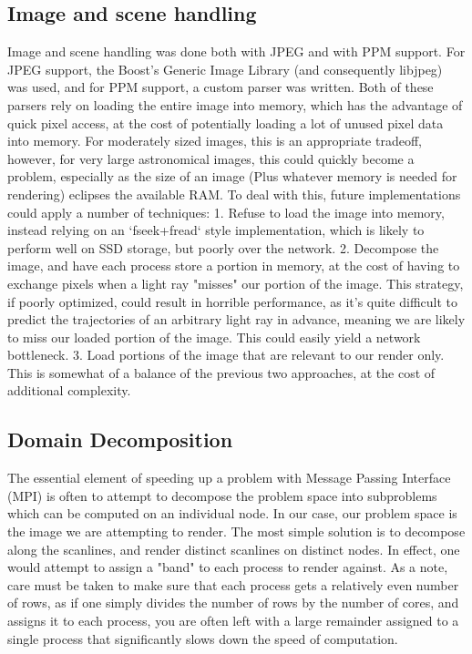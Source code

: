 \subsection{Image and scene handling}
Image and scene handling was done both with JPEG and with PPM support.
For JPEG support, the Boost's Generic Image Library
\cite{schaling_boost,bourdev2007generic} (and consequently libjpeg) was used, and for PPM support, a custom parser was written. Both of these parsers rely on loading the entire image into memory, which has the advantage of quick pixel access, at the cost of potentially loading a lot of unused pixel data into memory. For moderately sized images, this is an appropriate tradeoff, however, for very large astronomical images, this could quickly become a problem, especially as the size of an image (Plus whatever memory is needed for rendering) eclipses the available RAM. To deal with this, future implementations could apply a number of techniques:
1. Refuse to load the image into memory, instead relying on an `fseek+fread` style implementation, which is likely to perform well on SSD storage, but poorly over the network.
2. Decompose the image, and have each process store a portion in memory, at the cost of having to exchange pixels when a light ray "misses" our portion of the image. This strategy, if poorly optimized, could result in horrible performance, as it's quite difficult to predict the trajectories of an arbitrary light ray in advance, meaning we are likely to miss our loaded portion of the image. This could easily yield a network bottleneck.
3. Load portions of the image that are relevant to our render only. This is somewhat of a balance of the previous two approaches, at the cost of additional complexity. 


\subsection{Domain Decomposition}
The essential element of speeding up a problem with Message Passing Interface (MPI) \cite{mpi41} is often to attempt to decompose the problem space into subproblems which can be computed on an individual node. In our case, our problem space is the image we are attempting to render. The most simple solution is to decompose along the scanlines, and render distinct scanlines on distinct nodes. In effect, one would attempt to assign a "band" to each process to render against. As a note, care must be taken to make sure that each process gets a relatively even number of rows, as if one simply divides the number of rows by the number of cores, and assigns it to each process, you are often left with a large remainder assigned to a single process that significantly slows down the speed of computation.

